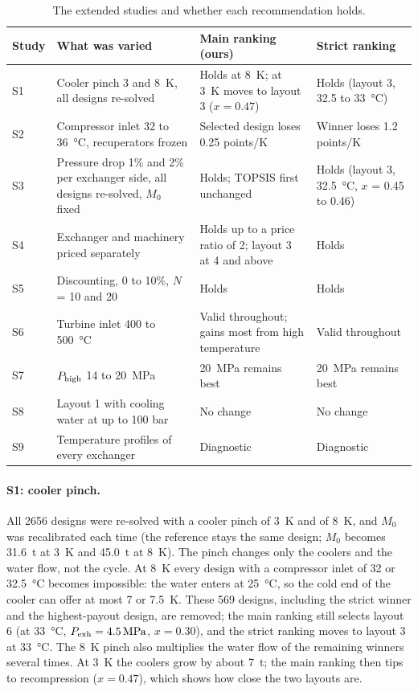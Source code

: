 \begin{table}[h]\centering\footnotesize
\setlength{\tabcolsep}{4pt}
\begin{tabularx}{\textwidth}{@{}l >{\raggedright\arraybackslash}X >{\raggedright\arraybackslash}X >{\raggedright\arraybackslash}X@{}}
\toprule
Study & What was varied & Main ranking (ours) & Strict ranking\\
\midrule
S1 & Cooler pinch 3 and \SI{8}{K}, all designs re-solved & Holds at \SI{8}{K}; at \SI{3}{K} moves to layout 3 ($x = 0.47$) & Holds (layout 3, \SI{32.5}{} to \SI{33}{\celsius})\\
S2 & Compressor inlet 32 to \SI{36}{\celsius}, recuperators frozen & Selected design loses 0.25 points/K & Winner loses 1.2 points/K\\
S3 & Pressure drop 1\% and 2\% per exchanger side, all designs re-solved, $M_0$ fixed & Holds; TOPSIS first unchanged & Holds (layout 3, \SI{32.5}{\celsius}, $x$ = 0.45 to 0.46)\\
S4 & Exchanger and machinery priced separately & Holds up to a price ratio of 2; layout 3 at 4 and above & Holds\\
S5 & Discounting, 0 to 10\%, $N$ = 10 and 20 & Holds & Holds\\
S6 & Turbine inlet 400 to \SI{500}{\celsius} & Valid throughout; gains most from high temperature & Valid throughout\\
S7 & $P_\mathrm{high}$ 14 to \SI{20}{MPa} & \SI{20}{MPa} remains best & \SI{20}{MPa} remains best\\
S8 & Layout 1 with cooling water at up to 100 bar & No change & No change\\
S9 & Temperature profiles of every exchanger & Diagnostic & Diagnostic\\
\bottomrule
\end{tabularx}
\caption{The extended studies and whether each recommendation holds.}\label{tab:studies}
\end{table}

\paragraph{S1: cooler pinch.} All 2656 designs were re-solved with a cooler pinch of \SI{3}{K} and of \SI{8}{K}, and $M_0$ was recalibrated each time (the reference stays the same design; $M_0$ becomes \SI{31.6}{t} at \SI{3}{K} and \SI{45.0}{t} at \SI{8}{K}). The pinch changes only the coolers and the water flow, not the cycle. At \SI{8}{K} every design with a compressor inlet of 32 or \SI{32.5}{\celsius} becomes impossible: the water enters at \SI{25}{\celsius}, so the cold end of the cooler can offer at most 7 or \SI{7.5}{K}. These 569 designs, including the strict winner and the highest-payout design, are removed; the main ranking still selects layout 6 (at \SI{33}{\celsius}, $P_\mathrm{exh} = \SI{4.5}{MPa}$, $x = 0.30$), and the strict ranking moves to layout 3 at \SI{33}{\celsius}. The \SI{8}{K} pinch also multiplies the water flow of the remaining winners several times. At \SI{3}{K} the coolers grow by about \SI{7}{t}; the main ranking then tips to recompression ($x = 0.47$), which shows how close the two layouts are.

